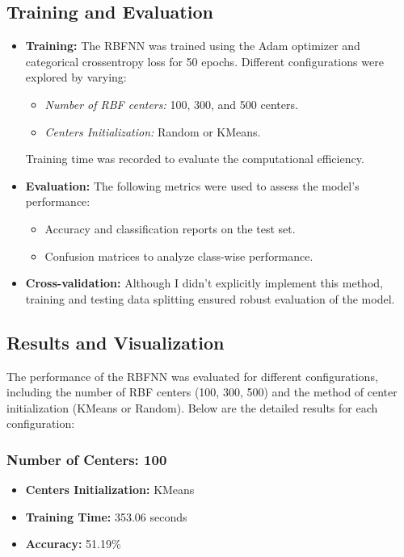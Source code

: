 \documentclass[lettersize,journal]{IEEEtran}
\begin{document}
\subsection{\textbf{Training and Evaluation}}
\begin{itemize}
    \item \textbf{Training:} 
    The RBFNN was trained using the Adam optimizer and categorical crossentropy loss for 50 epochs. Different configurations were explored by varying:
    \begin{itemize}
        \item \textit{Number of RBF centers:} 100, 300, and 500 centers.
        \item \textit{Centers Initialization:} Random or KMeans.
    \end{itemize}
    Training time was recorded to evaluate the computational efficiency.
    \item \textbf{Evaluation:} 
    The following metrics were used to assess the model’s performance:
    \begin{itemize}
        \item Accuracy and classification reports on the test set.
        \item Confusion matrices to analyze class-wise performance.
    \end{itemize}
    \item \textbf{Cross-validation:} 
    Although I didn't explicitly implement this method, training and testing data splitting ensured robust evaluation of the model.
\end{itemize}

\subsection{\textbf{Results and Visualization}}

The performance of the RBFNN was evaluated for different configurations, including the number of RBF centers (100, 300, 500) and the method of center initialization (KMeans or Random). Below are the detailed results for each configuration:

\subsubsection{\textbf{Number of Centers: 100}}
\begin{itemize}
    \item \textbf{Centers Initialization:} KMeans
    \item \textbf{Training Time:} 353.06 seconds
    \item \textbf{Accuracy:} 51.19\%
\end{itemize}
\end{document}
